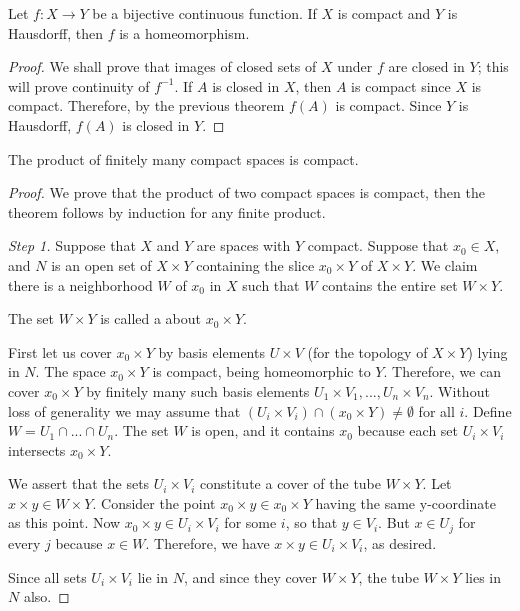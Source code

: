 \documentclass[12pt, a4paper, oneside, openright, titlepage]{book}
\begin{document}
\begin{theorem}
    Let $f:X\rightarrow Y$ be a bijective continuous function. If $X$ is compact and $Y$ is Hausdorff, then $f$ is a homeomorphism.
\end{theorem}
\begin{proof}
    We shall prove that images of closed sets of $X$ under $f$ are closed in $Y$; this will prove continuity of $f^{-1}$. If $A$ is closed in $X$, then $A$ is compact since $X$ is compact. Therefore, by the previous theorem $f(A)$ is compact. Since $Y$ is Hausdorff, $f(A)$ is closed in $Y$.
\end{proof}

\begin{theorem}
    The product of finitely many compact spaces is compact.
\end{theorem}
\begin{proof}
    We prove that the product of two compact spaces is compact, then the theorem follows by induction for any finite product.

    \emph{Step 1.} Suppose that $X$ and $Y$ are spaces with $Y$ compact. Suppose that $x_0 \in X$, and $N$ is an open set of $X\times Y$ containing the slice $x_0\times Y$ of $X\times Y$.
    We claim there is a neighborhood $W$ of $x_0$ in $X$ such that $W$ contains the entire set $W\times Y$.

    The set $W\times Y$ is called a  about $x_0\times Y$.

    First let us cover $x_0\times Y$ by basis elements $U\times V$ (for the topology of $X\times Y$) lying in $N$. The space $x_0 \times Y$ is compact, being homeomorphic to $Y$. Therefore, we can cover $x_0\times Y$ by finitely many such basis elements $U_1\times V_1,...,U_n\times V_n$. Without loss of generality we may assume that $(U_i\times V_i) \cap (x_0\times Y) \neq \emptyset$ for all $i$. Define $W = U_1\cap ... \cap U_n$. The set $W$ is open, and it contains $x_0$ because each set $U_i\times V_i$ intersects $x_0\times Y$.

    We assert that the sets $U_i\times V_i$ constitute a cover of the tube $W\times Y$. Let $x\times y \in W\times Y$. Consider the point $x_0\times y \in x_0\times Y$ having the same y-coordinate as this point. Now $x_0\times y \in U_i\times V_i$ for some $i$, so that $y \in V_i$. But $x \in U_j$ for every $j$ because $x \in W$. Therefore, we have $x \times y \in U_i\times V_i$, as desired.

    Since all sets $U_i\times V_i$ lie in $N$, and since they cover $W\times Y$, the tube $W\times Y$ lies in $N$ also.


\end{proof}
\end{document}
